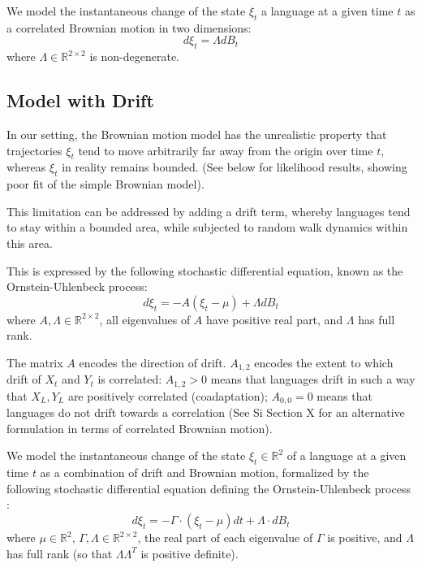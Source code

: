 \documentclass[11pt,a4paper]{article}
\begin{document}
We model the instantaneous change of the state $\xi_t$ a language at a given time $t$ as a correlated Brownian motion in two dimensions:
\begin{equation*}
    d\xi_t = \Lambda dB_t
\end{equation*}
where $\Lambda \in \mathbb{R}^{2\times 2}$ is non-degenerate.

\subsection{Model with Drift}

In our setting, the Brownian motion model has the unrealistic property that trajectories $\xi_t$ tend to move arbitrarily far away from the origin over time $t$, whereas $\xi_t$ in reality remains bounded.
(See below for likelihood results, showing poor fit of the simple Brownian model).

This limitation can be addressed by adding a drift term, whereby languages tend to stay within a bounded area, while subjected to random walk dynamics within this area.

This is expressed by the following stochastic differential equation, known as the Ornstein-Uhlenbeck process:
\begin{equation*}
    d\xi_t = -A(\xi_t-\mu) + \Lambda dB_t
\end{equation*}
where $A, \Lambda \in \mathbb{R}^{2\times 2}$, all eigenvalues of $A$ have positive real part, and $\Lambda$ has full rank.


The matrix $A$ encodes the direction of drift.
$A_{1,2}$ encodes the extent to which drift of $X_t$ and $Y_t$ is correlated:
$A_{1,2} > 0$ means that languages drift in such a way that $X_L, Y_L$ are positively correlated (coadaptation); $A_{0,0} = 0$ means that languages do not drift towards a correlation (See Si Section X for an alternative formulation in terms of correlated Brownian motion).


We model the instantaneous change of the state $\xi_t \in \mathbb{R}^2$ of a language at a given time $t$ as a combination of drift and Brownian motion, formalized by the following stochastic differential equation defining the Ornstein-Uhlenbeck process \citep[p. 109, eq. 4.4.42]{gardiner1983handbook}:
\begin{equation*}
    d\xi_t = -\Gamma \cdot (\xi_t-\mu) dt + \Lambda \cdot dB_t
\end{equation*}
where $\mu \in \mathbb{R}^2$, $\Gamma, \Lambda \in \mathbb{R}^{2\times 2}$, the real part of each eigenvalue of $\Gamma$ is positive, and $\Lambda$ has full rank (so that $\Lambda\Lambda^T$ is positive definite).
\end{document}
